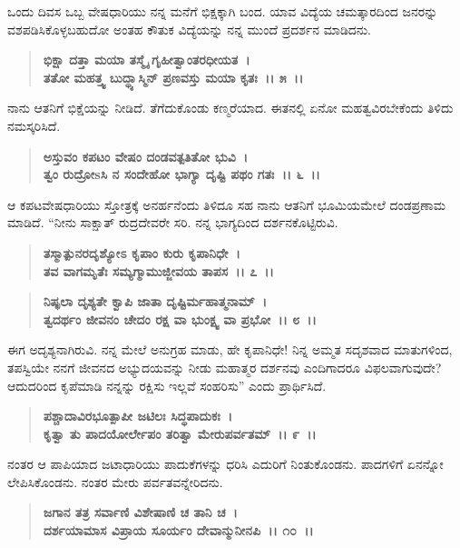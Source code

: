 ಒಂದು ದಿವಸ ಒಬ್ಬ ವೇಷಧಾರಿಯು ನನ್ನ ಮನೆಗೆ ಭಿಕ್ಷಕ್ಕಾಗಿ ಬಂದ. ಯಾವ ವಿದ್ಯೆಯ ಚಮತ್ಕಾರದಿಂದ ಜನರನ್ನು ವಶಪಡಿಸಿಕೊಳ್ಳಬಹುದೋ ಅಂತಹ ಕೌತುಕ ವಿದ್ಯೆಯನ್ನು ನನ್ನ ಮುಂದೆ ಪ್ರದರ್ಶನ ಮಾಡಿದನು.

\begin{verse}
\textbf{ಭಿಕ್ಷಾ ದತ್ತಾ ಮಯಾ ತಸ್ಮೈ ಗೃಹೀತ್ವಾಂತರಧೀಯತ~।}\\\textbf{ತತೋ ಮಹತ್ತ್ವ ಬುದ್ಧ್ಯಾಸ್ಮಿನ್ ಪ್ರಣವಸ್ತು ಮಯಾ ಕೃತಃ~।। ೫~।।}
\end{verse}

ನಾನು ಆತನಿಗೆ ಭಿಕ್ಷೆಯನ್ನು ನೀಡಿದೆ. ತೆಗೆದುಕೊಂಡು ಕಣ್ಮರೆಯಾದ. ಈತನಲ್ಲಿ ಏನೋ ಮಹತ್ವವಿರಬೇಕೆಂದು ತಿಳಿದು ನಮಸ್ಕರಿಸಿದೆ.

\begin{verse}
\textbf{ಅಸ್ತುವಂ ಕಪಟಂ ವೇಷಂ ದಂಡವತ್ಪತಿತೋ ಭುವಿ~।}\\\textbf{ತ್ವಂ ರುದ್ರೋsಸಿ ನ ಸಂದೇಹೋ ಭಾಗ್ಯಾ ದೃಷ್ಟಿ ಪಥಂ ಗತಃ~।। ೬~।।}
\end{verse}

ಆ ಕಪಟವೇಷಧಾರಿಯು ಸ್ತೋತ್ರಕ್ಕೆ ಅನರ್ಹನೆಂದು ತಿಳಿದೂ ಸಹ ನಾನು ಆತನಿಗೆ ಭೂಮಿಯಮೇಲೆ ದಂಡಪ್ರಣಾಮ ಮಾಡಿದೆ. “ನೀನು ಸಾಕ್ಷಾತ್ ರುದ್ರದೇವರೇ ಸರಿ. ನನ್ನ ಭಾಗ್ಯದಿಂದ ದರ್ಶನಕೊಟ್ಟಿರುವಿ.

\begin{verse}
\textbf{ತಸ್ಮಾತ್ಪುನರದೃಶ್ಯೋಽ ಕೃಪಾಂ ಕುರು ಕೃಪಾನಿಧೇ~।}\\\textbf{ತವ ವಾಗಮೃತೆಃ ಸಮ್ಯಗ್ಮಾಮುಜ್ಜೀವಯ ತಾಪಸ~।। ೭~।।} 
\end{verse}

\begin{verse}
\textbf{ನಿಷ್ಫಲಾ ದೃಶ್ಯತೇ ಕ್ವಾಪಿ ಜಾತಾ ದೃಷ್ಟಿರ್ಮಹಾತ್ಮನಾಮ್~।}\\\textbf{ತ್ವದರ್ಥಂ ಜೀವನಂ ಚೇದಂ ರಕ್ಷ ವಾ ಭುಂಕ್ಷ್ವ ವಾ ಪ್ರಭೋ~।। ೮~।।}
\end{verse}

ಈಗ ಅದೃಶ್ಯನಾಗಿರುವಿ. ನನ್ನ ಮೇಲೆ ಅನುಗ್ರಹ ಮಾಡು, ಹೇ ಕೃಪಾನಿಧೇ! ನಿನ್ನ ಅಮ್ಮತ ಸದೃಶವಾದ ಮಾತುಗಳಿಂದ, ತಪಸ್ವಿಯೇ ನನಗೆ ಜೀವನದ ಅಭ್ಯುದಯವನ್ನು ನೀಡು ಮಹಾತ್ಮರ ದರ್ಶನವು ಎಂದಿಗಾದರೂ ವಿಫಲವಾಗುವುದೇ? ಆದುದರಿಂದ ಕೃಪೆಮಾಡಿ ನನ್ನನ್ನು ರಕ್ಷಿಸು ಇಲ್ಲವೆ ಸಂಹರಿಸು” ಎಂದು ಪ್ರಾರ್ಥಿಸಿದೆ.

\begin{verse}
\textbf{ಪಶ್ಚಾದಾವಿರಭೂತ್ಪಾಪೀ ಜಟಿಲಃ ಸಿದ್ಧಪಾದುಕಃ~।}\\\textbf{ಕೃತ್ವಾ ತು ಪಾದಯೋರ್ಲೇಪಂ ತರಿತ್ವಾ ಮೇರುಪರ್ವತಮ್~।। ೯~।।}
\end{verse}

ನಂತರ ಆ ಪಾಪಿಯಾದ ಜಟಾಧಾರಿಯು ಪಾದುಕೆಗಳನ್ನು ಧರಿಸಿ ಎದುರಿಗೆ ನಿಂತುಕೊಂಡನು. ಪಾದಗಳಿಗೆ ಏನನ್ನೋ ಲೇಪಿಸಿಕೊಂಡನು. ನಂತರ ಮೇರು ಪರ್ವತವನ್ನೇರಿದನು.

\begin{verse}
\textbf{ಜಗಾನ ತತ್ರ ಸರ್ವಾಣಿ ವಿಶೇಷಾಣಿ ಚ ತಾನಿ ಚ~।}\\\textbf{ದರ್ಶಯಾಮಾಸ ವಿಪ್ರಾಯ ಸೂರ್ಯಂ ದೇವಾನ್ಮುನೀನಪಿ~।। ೧೦~।। }
\end{verse}

